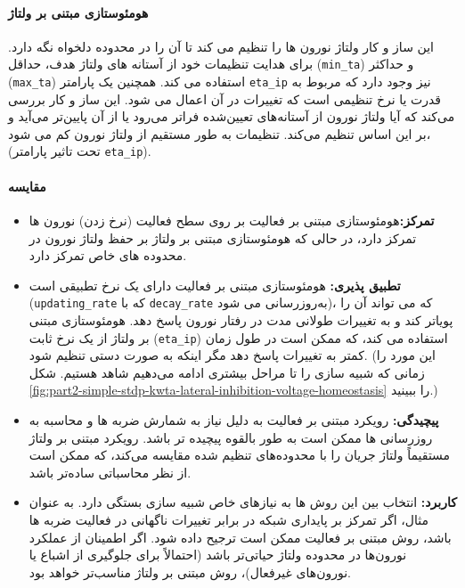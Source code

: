             \paragraph*{هومئوستازی مبتنی بر ولتاژ}
            این ساز و کار ولتاژ نورون ها را تنظیم می کند تا آن را در محدوده دلخواه نگه دارد. برای هدایت تنظیمات خود از آستانه های ولتاژ هدف، حداقل
            (\texttt{min\_ta})
            و حداکثر
            (\texttt{max\_ta})
            استفاده می کند. همچنین یک پارامتر 
            \texttt{eta\_ip} 
            نیز وجود دارد که مربوط به قدرت یا نرخ تنظیمی است که تغییرات در آن اعمال می شود. این ساز و کار بررسی می‌کند که آیا ولتاژ نورون از آستانه‌های تعیین‌شده فراتر می‌رود یا از آن پایین‌تر می‌آید و بر این اساس تنظیم می‌کند. تنظیمات به طور مستقیم از ولتاژ نورون کم می شود، 
            (تحت تاثیر پارامتر 
            \texttt{eta\_ip}).

            \paragraph*{مقایسه}
            \begin{itemize}
                \item \textbf{تمرکز:}هومئوستازی مبتنی بر فعالیت بر روی سطح فعالیت 
                (نرخ زدن) 
                نورون ها تمرکز دارد، در حالی که هومئوستازی مبتنی بر ولتاژ بر حفظ ولتاژ نورون در محدوده های خاص تمرکز دارد.
                \item \textbf{تطبیق پذیری:} هومئوستازی مبتنی بر فعالیت دارای یک نرخ تطبیقی ​​است 
                (\texttt{updating\_rate}
                که با 
                \texttt{decay\_rate} 
                به‌روزرسانی می شود)، 
                که می تواند آن را پویاتر کند و به تغییرات طولانی مدت در رفتار نورون پاسخ دهد. هومئوستازی مبتنی بر ولتاژ از یک نرخ ثابت 
                (\texttt{eta\_ip}) 
                استفاده می کند، که ممکن است در طول زمان کمتر به تغییرات پاسخ دهد مگر اینکه به صورت دستی تنظیم شود. 
                (این مورد را زمانی که شبیه سازی را تا مراحل بیشتری ادامه می‌دهیم شاهد هستیم. شکل 
                \ref{fig:part2-simple-stdp-kwta-lateral-inhibition-voltage-homeostasis} 
                را ببینید.)
                \item \textbf{پیچیدگی:} رویکرد مبتنی بر فعالیت به دلیل نیاز به شمارش ضربه ها و محاسبه به روزرسانی ها ممکن است به طور بالقوه پیچیده تر باشد. رویکرد مبتنی بر ولتاژ مستقیماً ولتاژ جریان را با محدوده‌های تنظیم شده مقایسه می‌کند، که ممکن است از نظر محاسباتی ساده‌تر باشد.
                \item \textbf{کاربرد:} انتخاب بین این روش ها به نیازهای خاص شبیه سازی بستگی دارد. به عنوان مثال، اگر تمرکز بر پایداری شبکه در برابر تغییرات ناگهانی در فعالیت ضربه ها باشد، روش مبتنی بر فعالیت ممکن است ترجیح داده شود. اگر اطمینان از عملکرد نورون‌ها در محدوده ولتاژ حیاتی‌تر باشد (احتمالاً برای جلوگیری از اشباع یا نورون‌های غیرفعال)،
                 روش مبتنی بر ولتاژ مناسب‌تر خواهد بود.
            \end{itemize}

